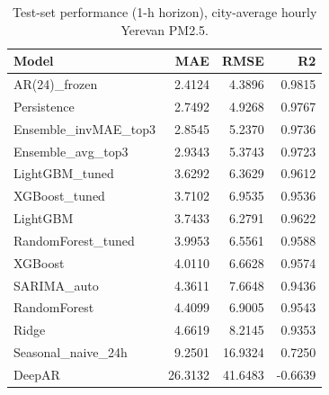 \begin{table}[t]
\centering
\small
\caption{Test-set performance (1-h horizon), city-average hourly Yerevan PM2.5.}
\label{tab:main_results}
\begin{tabular}{lrrr}
\toprule
Model & MAE & RMSE & R2 \\
\midrule
AR(24)\_frozen & 2.4124 & 4.3896 & 0.9815 \\
Persistence & 2.7492 & 4.9268 & 0.9767 \\
Ensemble\_invMAE\_top3 & 2.8545 & 5.2370 & 0.9736 \\
Ensemble\_avg\_top3 & 2.9343 & 5.3743 & 0.9723 \\
LightGBM\_tuned & 3.6292 & 6.3629 & 0.9612 \\
XGBoost\_tuned & 3.7102 & 6.9535 & 0.9536 \\
LightGBM & 3.7433 & 6.2791 & 0.9622 \\
RandomForest\_tuned & 3.9953 & 6.5561 & 0.9588 \\
XGBoost & 4.0110 & 6.6628 & 0.9574 \\
SARIMA\_auto & 4.3611 & 7.6648 & 0.9436 \\
RandomForest & 4.4099 & 6.9005 & 0.9543 \\
Ridge & 4.6619 & 8.2145 & 0.9353 \\
Seasonal\_naive\_24h & 9.2501 & 16.9324 & 0.7250 \\
DeepAR & 26.3132 & 41.6483 & -0.6639 \\
\bottomrule
\end{tabular}
\end{table}

